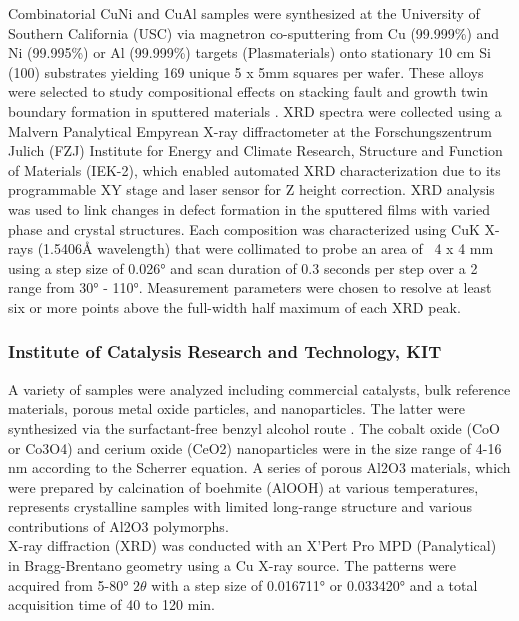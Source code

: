 Combinatorial CuNi and CuAl samples were synthesized at the University of Southern California (USC) via magnetron co-sputtering from Cu (99.999\%) and Ni (99.995\%) or Al (99.999\%) targets (Plasmaterials) onto stationary 10 cm Si (100) substrates yielding 169 unique 5 x 5mm squares per wafer. These alloys were selected to study compositional effects on stacking fault and growth twin boundary formation in sputtered materials \cite{2024AcMat.27019839A,alwen2024combinatorial}. XRD spectra were collected using a Malvern Panalytical Empyrean X-ray diffractometer at the Forschungszentrum Julich (FZJ) Institute for Energy and Climate Research, Structure and Function of Materials (IEK-2), which enabled automated XRD characterization due to its programmable XY stage and laser sensor for Z height correction. XRD analysis was used to link changes in defect formation in the sputtered films with varied phase and crystal structures. Each composition was characterized using CuK X-rays (1.5406Å wavelength) that were collimated to probe an area of ~4 x 4 mm using a step size of 0.026° and scan duration of 0.3 seconds per step over a 2 range from 30° - 110°. Measurement parameters were chosen to resolve at least six or more points above the full-width half maximum of each XRD peak.

\subsubsection*{Institute of Catalysis Research and Technology, KIT}

A variety of samples were analyzed including commercial catalysts, bulk reference materials, porous metal oxide particles, and nanoparticles. The latter were synthesized via the surfactant-free benzyl alcohol route \cite{Wolf2019, Wolf2018}. The cobalt oxide (CoO or Co3O4) and cerium oxide (CeO2) nanoparticles were in the size range of 4-16 nm according to the Scherrer equation. A series of porous Al2O3 materials, which were prepared by calcination of boehmite (AlOOH) at various temperatures, represents crystalline samples with limited long-range structure and various contributions of Al2O3 polymorphs.\\

X-ray diffraction (XRD) was conducted with an X’Pert Pro MPD (Panalytical) in Bragg-Brentano geometry using a Cu X-ray source. The patterns were acquired from 5-80° $2\theta$ with a step size of 0.016711° or 0.033420° and a total acquisition time of 40 to 120 min. \\


